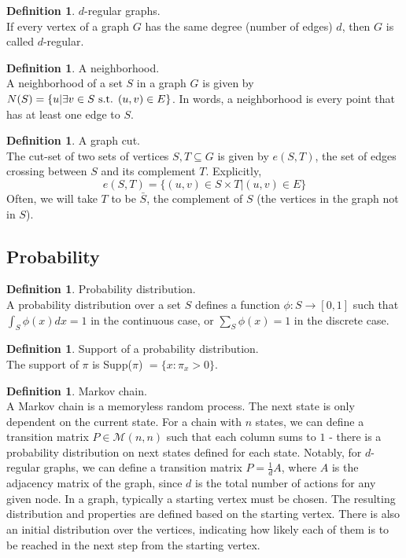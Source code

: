 \documentclass[11pt]{article}
\theoremstyle{definition}
\newtheorem{definition}[theorem]{Definition}
\theoremstyle{definition}
\theoremstyle{definition}
\newcommand{\mc}[1]
{\mathcal{#1}}
\newcommand{\txt}[1]
{\textnormal{#1}}
\begin{document}
\begin{definition} $d$-regular graphs. \\
If every vertex of a graph $G$ has the same degree (number of edges) $d$, 
then $G$ is called $d$-regular.
\end{definition}

\begin{definition} A neighborhood. \\
A neighborhood of a set $S$ in a graph $G$ is given by
$N(S) = \{u | \exists v \in S \txt{ s.t. } (u, v) \in E\}$. 
In words, a neighborhood is every point that has at least one edge to $S$. 
\end{definition}

\begin{definition} A graph cut. \\
The cut-set of two sets of vertices $S, T \subseteq G$ is given by $e(S, T)$, 
the set of edges crossing between $S$ and its complement $T$. Explicitly, 
\[
e(S, T) = \{(u, v) \in S \times T | (u, v) \in E\}
\]
Often, we will take $T$ to be $\bar{S}$, the complement of $S$ (the vertices in the graph
not in $S$).
\end{definition}

\subsection{Probability}

\begin{definition} Probability distribution. \\
A probability distribution over a set $S$ defines a function
$\phi: S \to [0, 1]$ such that $\int_S \phi(x) dx = 1$ in the continuous case, or $\sum_S \phi(x) = 1$ in the discrete case.
\end{definition}

\begin{definition} Support of a probability distribution. \\
The support of $\pi$ is Supp($\pi$) $= \{x: \pi_x > 0\}$. 
\end{definition}

\begin{definition} Markov chain. \\
A Markov chain is a memoryless random process. The next state is only dependent on the current state.
For a chain with $n$ states, we can define a transition matrix $P \in \mc{M}(n, n)$ such that each column sums to $1$ - there is a probability distribution on next states defined for each state. Notably, for $d$-regular graphs, we can define a transition matrix $P = \frac{1}{d}A$, where $A$ is the adjacency matrix of the graph, since $d$ is the total number of actions for any given node.
In a graph, typically a starting vertex must be chosen. The resulting distribution and properties are defined based on the starting vertex. There is also an initial distribution over the vertices, indicating
how likely each of them is to be reached in the next step from the starting vertex. 
\end{definition}
\end{document}
